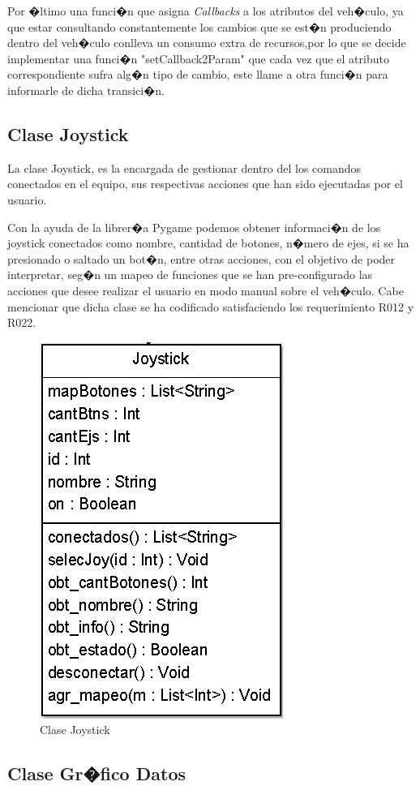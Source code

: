 Por �ltimo una funci�n que asigna \textit{Callbacks} a los atributos del veh�culo, ya que estar consultando constantemente los cambios que se est�n produciendo dentro del veh�culo conlleva un consumo extra de recursos,por lo que se decide implementar una funci�n "setCallback2Param" que cada vez que el atributo correspondiente sufra alg�n tipo de cambio, este llame a otra funci�n para informarle de dicha transici�n.


\subsection{Clase Joystick}

La clase Joystick, es la encargada de gestionar dentro del los comandos conectados en el equipo, sus respectivas acciones que han sido ejecutadas por el usuario. \par Con la ayuda de la librer�a Pygame podemos obtener informaci�n de los joystick conectados como nombre, cantidad de botones, n�mero de ejes, si se ha presionado o saltado un bot�n, entre otras acciones, con el objetivo de poder interpretar, seg�n un mapeo de funciones que se han pre-configurado las acciones que desee realizar el usuario en modo manual sobre el veh�culo. Cabe mencionar que dicha clase se ha codificado satisfaciendo los requerimiento R012 y R022.


\begin{figure}[h!]
	\centering
	\includegraphics[width=0.3\linewidth, height=0.15\textheight]{Imagenes/classJoystick}
	\caption{Clase Joystick}
	\label{fig:classjoystick}
\end{figure}


\newpage
\subsection{Clase Gr�fico Datos}



